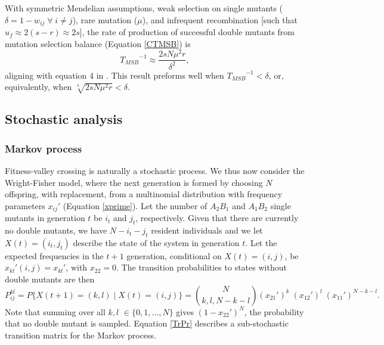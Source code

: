 \documentclass[review,3p,authoryear]{elsarticle}
\begin{document}
With symmetric Mendelian assumptions, weak selection on single mutants ($\delta=1-w_{ij} \;\forall \;i\neq j$), rare mutation ($\mu$), and infrequent recombination [such that $u_f\approx 2(s-r)\approx 2s$], the rate of production of successful double mutants from mutation selection balance (Equation \ref{CTMSB}) is 
\begin{equation}\label{Tweiss}
{T_{MSB}}^{-1} \approx \frac{2sN\mu^2r}{\delta^2},
\end{equation}
aligning with equation 4 in \citeauthor{Weissman2010} \citeyearpar[][see supplementary \textit{Mathematica} file]{Weissman2010}. 
This result preforms well when ${T_{MSB}}^{-1} < \delta$, or, equivalently, when $\sqrt[3]{2sN\mu^2r} < \delta$.

\subsection{Stochastic analysis}

\subsubsection{Markov process}

Fitness-valley crossing is naturally a stochastic process.
We thus now consider the Wright-Fisher model, where the next generation is formed by choosing $N$ offspring, with replacement, from a multinomial distribution with frequency parameters $x_{ij}'$ (Equation \ref{xprime}).
Let the number of $A_2B_1$ and $A_1B_2$ single mutants in generation $t$ be $i_t$ and $j_t$, respectively.
Given that there are currently no double mutants, we have $N-i_t-j_t$ resident individuals and we let $X(t)=(i_t,j_t)$ describe the state of the system in generation $t$.
Let the expected frequencies in the $t+1$ generation, conditional on $X(t)=(i,j)$, be $x_{kl}'(i,j) = x_{kl}'$, with $x_{22}=0$. 
The transition probabilities to states without double mutants are then
\begin{equation}\label{TrPr}
P_{ij}^{kl}=P\{ X(t+1) = (k,l)\; |\; X(t)=(i,j) \} = \binom{N}{k, l, N-k-l} (x_{21}')^k\; (x_{12}')^l\; (x_{11}')^{N-k-l}.
\end{equation}
Note that summing over all $k,l$ $\in \{0,1,...,N\}$ gives $(1-x_{22}')^N$, the probability that no double mutant is sampled.
Equation \eqref{TrPr} describes a sub-stochastic transition matrix for the Markov process.
\end{document}
